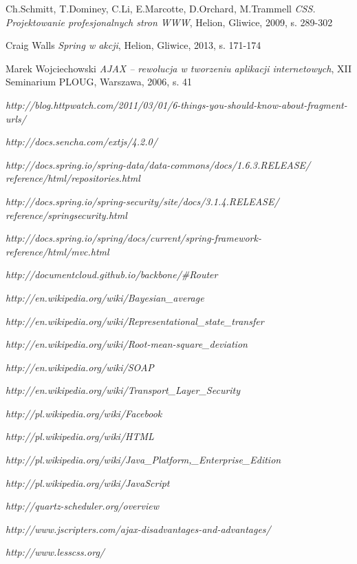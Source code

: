 \begin{thebibliography}{99}
	
	Ch.Schmitt, T.Dominey, C.Li, E.Marcotte, D.Orchard, M.Trammell
	\emph{CSS. Projektowanie profesjonalnych stron WWW},
	Helion,
	Gliwice, 2009,
	s. 289-302	
	
	Craig Walls
	\emph{Spring w akcji},
	Helion,
	Gliwice, 2013,
	s. 171-174
	
	Marek Wojciechowski
	\emph{AJAX – rewolucja w tworzeniu aplikacji internetowych},
	XII Seminarium PLOUG,
	Warszawa, 2006,
	s. 41

	\emph{http://blog.httpwatch.com/2011/03/01/6-things-you-should-know-about-fragment-urls/}

	\emph{http://docs.sencha.com/extjs/4.2.0/}	
	
	\emph{http://docs.spring.io/spring-data/data-commons/docs/1.6.3.RELEASE/\\reference/html/repositories.html}
	
	\emph{http://docs.spring.io/spring-security/site/docs/3.1.4.RELEASE/\\reference/springsecurity.html}

	\emph{http://docs.spring.io/spring/docs/current/spring-framework-reference/html/mvc.html}
	
	\emph{http://documentcloud.github.io/backbone/\#Router}

	\emph{http://en.wikipedia.org/wiki/Bayesian\_average}
	
	\emph{http://en.wikipedia.org/wiki/Representational\_state\_transfer}	
		
	\emph{http://en.wikipedia.org/wiki/Root-mean-square\_deviation}
	
	\emph{http://en.wikipedia.org/wiki/SOAP}
	
	\emph{http://en.wikipedia.org/wiki/Transport\_Layer\_Security}

	\emph{http://pl.wikipedia.org/wiki/Facebook}
	
	\emph{http://pl.wikipedia.org/wiki/HTML}		
	
	\emph{http://pl.wikipedia.org/wiki/Java\_Platform,\_Enterprise\_Edition}
	
	\emph{http://pl.wikipedia.org/wiki/JavaScript}			
	
	\emph{http://quartz-scheduler.org/overview}

	\emph{http://www.jscripters.com/ajax-disadvantages-and-advantages/}
	
	\emph{http://www.lesscss.org/}	

\end{thebibliography}
